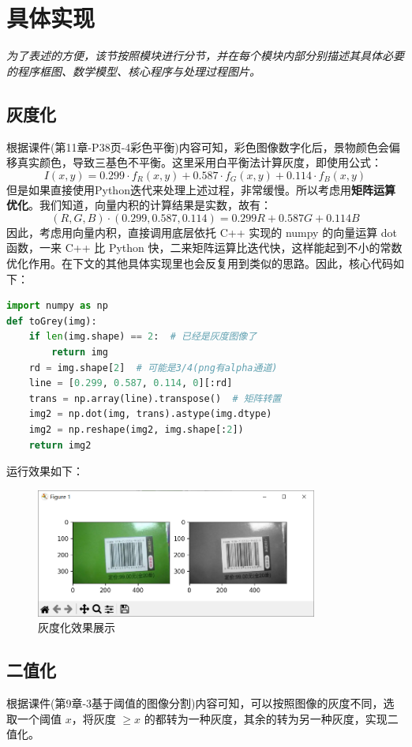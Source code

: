 \documentclass{ctexart}
\begin{document}
\section{具体实现}
\textit{为了表述的方便，该节按照模块进行分节，并在每个模块内部分别描述其具体必要的程序框图、数学模型、核心程序与处理过程图片。}
\subsection{灰度化}
根据课件(第11章-P38页-4彩色平衡)内容可知，彩色图像数字化后，景物颜色会偏移真实颜色，导致三基色不平衡。这里采用白平衡法计算灰度，即使用公式：%
\[I(x,y)=0.299\cdot f_R(x,y)+0.587\cdot f_G(x,y)+0.114\cdot f_B(x,y)\] %
但是如果直接使用Python迭代来处理上述过程，非常缓慢。所以考虑用\textbf{矩阵运算优化}。我们知道，向量内积的计算结果是实数，故有：
\[(R,G,B)\cdot(0.299,0.587,0.114)=0.299R+0.587G+0.114B\]
因此，考虑用向量内积，直接调用底层依托 C++ 实现的 numpy 的向量运算 dot 函数，一来 C++ 比 Python 快，二来矩阵运算比迭代快，这样能起到不小的常数优化作用。在下文的其他具体实现里也会反复用到类似的思路。因此，核心代码如下：
\begin{lstlisting}[language=python]
import numpy as np
def toGrey(img):
    if len(img.shape) == 2:  # 已经是灰度图像了
        return img
    rd = img.shape[2]  # 可能是3/4(png有alpha通道)
    line = [0.299, 0.587, 0.114, 0][:rd]
    trans = np.array(line).transpose()  # 矩阵转置
    img2 = np.dot(img, trans).astype(img.dtype)
    img2 = np.reshape(img2, img.shape[:2])
    return img2
\end{lstlisting}
运行效果如下：
\begin{figure}[htbp]
    \centering
    \includegraphics[height=120pt]{sample_toGrey}
    \caption{灰度化效果展示}
\end{figure}


\subsection{二值化}
根据课件(第9章-3基于阈值的图像分割)内容可知，可以按照图像的灰度不同，选取一个阈值 $x$，将灰度 $\ge x$ 的都转为一种灰度，其余的转为另一种灰度，实现二值化。
\end{document}
